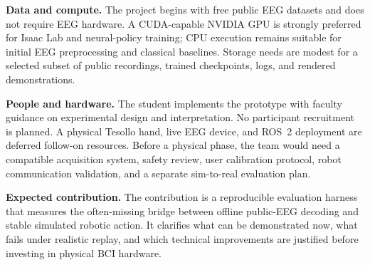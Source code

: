 \documentclass[11pt]{article}
\begin{document}
\textbf{Data and compute.} The project begins with free public EEG datasets and does not require EEG hardware. A CUDA-capable NVIDIA GPU is strongly preferred for Isaac Lab and neural-policy training; CPU execution remains suitable for initial EEG preprocessing and classical baselines. Storage needs are modest for a selected subset of public recordings, trained checkpoints, logs, and rendered demonstrations.

\textbf{People and hardware.} The student implements the prototype with faculty guidance on experimental design and interpretation. No participant recruitment is planned. A physical Tesollo hand, live EEG device, and ROS~2 deployment are deferred follow-on resources. Before a physical phase, the team would need a compatible acquisition system, safety review, user calibration protocol, robot communication validation, and a separate sim-to-real evaluation plan.

\textbf{Expected contribution.} The contribution is a reproducible evaluation harness that measures the often-missing bridge between offline public-EEG decoding and stable simulated robotic action. It clarifies what can be demonstrated now, what fails under realistic replay, and which technical improvements are justified before investing in physical BCI hardware.
\end{document}
